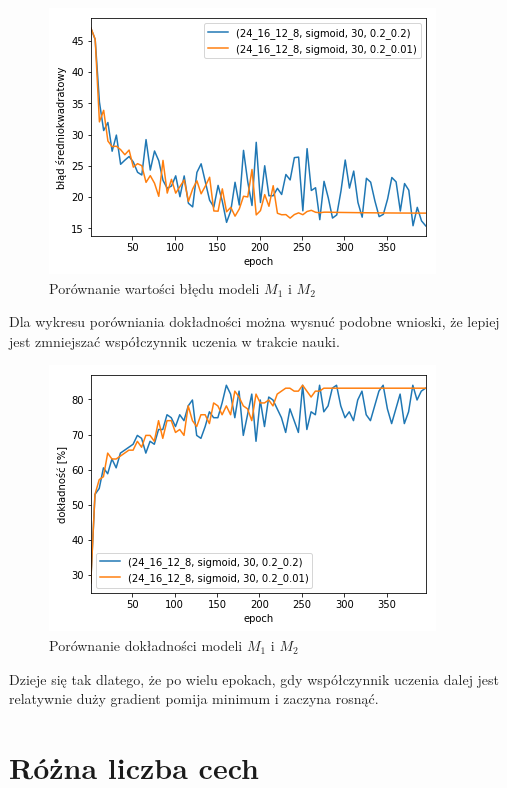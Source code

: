 \documentclass{report}
\begin{document}
    \begin{figure}[h]
        \centering
        \includegraphics[scale=0.8]{./img/lr-error.png}
        \caption{Porównanie wartości błędu modeli $M_1$ i $M_2$}
    \end{figure}

    Dla wykresu porówniania dokładności można wysnuć podobne wnioski, że lepiej jest zmniejszać współczynnik uczenia w trakcie nauki.

    \begin{figure}[h]
        \centering
        \includegraphics[scale=0.8]{././img/lr-accuracy.png}
        \caption{Porównanie dokładności modeli $M_1$ i $M_2$}
    \end{figure}

    Dzieje się tak dlatego, że po wielu epokach, gdy współczynnik uczenia dalej jest relatywnie duży gradient pomija minimum i zaczyna rosnąć.

    \section{Różna liczba cech}\label{sec:różnaLiczbaCech}
\end{document}
